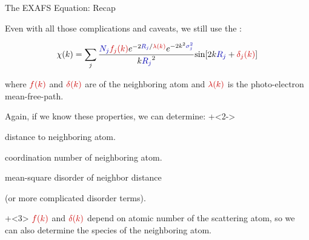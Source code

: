 

\begin{slide}{The EXAFS Equation: Recap}


  \begin{cenpage}{120mm}

    Even with all those complications and caveats, we still use the
    {}: \vspace{-1mm}

  \begin{center}
    \[ \chi(k) = \sum_j {\frac{{\Blue{N_j}} {\Red{f_j(k)}}
        e^{-2{\Blue{R_j}}/{\Red{\lambda(k)}}}
        e^{-2k^2{\Blue{\sigma_j^2}}}}{k{\Blue{R_j}}^2}
      {\sin[{2k{\Blue{R_j}} + {\Red{\delta_j(k)}}] }}} \]
  \end{center}

  \vmm

  where $\Red{f(k)}$ and $\Red{\delta(k)}$ are
  {} of the neighboring
  atom and $ \Red{\lambda(k)} $ is the photo-electron mean-free-path.

  \vmm


  \vmm
Again, if we know these properties, we can determine:
  \onslide+<2->
    \begin{description}
      \settowidth{\labelwidth}{15mm}
      \setlength{\itemindent}{15mm}
      \setlength{\leftmargin}{15mm}
    \item[$R$] distance to neighboring atom.
    \item[$N$] coordination number of neighboring atom.
    \item[$\sigma^2$] mean-square disorder of neighbor distance \par
      \hspace{13.5mm} (or
      more complicated disorder terms).
    \end{description}

  \vmm
  \onslide+<3>
  ${\Red{f(k)}}$ and ${\Red{\delta(k)}}$ depend on atomic number
  {} of the scattering atom, so we can also determine the
  species of the neighboring atom.

\end{cenpage}

\end{slide}


